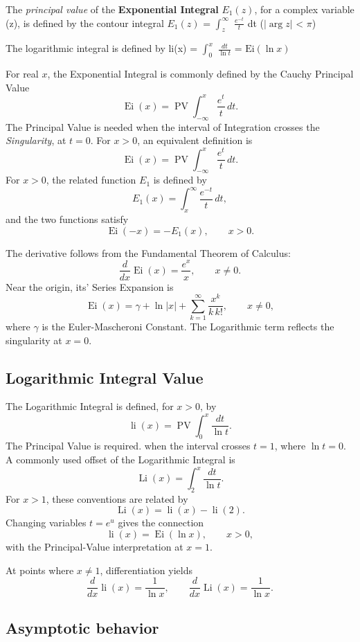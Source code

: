 \documentclass[a4paper, 10pt, onepage]{elegantbook}
\begin{document}
{The \emph{principal value} of the \textbf{Exponential Integral} $E_1(z)$, for a complex variable (z), is defined by the 
contour integral  $E_1(z)$ = $\int_{z}^{\infty}$ $\frac{e^{-t}}{t}$ dt \quad ($\vert \arg z \vert$ < $\pi$)  

The logarithmic integral is defined by $\text{li}$(x) = $\int_{0}^{x}$ $\frac{dt}{\ln t}$ = $\text{Ei}(\ln x)$  

For real \(x\), the Exponential Integral is commonly defined by the Cauchy Principal Value
\[
\operatorname{Ei}(x)
=\operatorname{PV}\int_{-\infty}^{x}\frac{e^t}{t}\,dt.
\]
The Principal Value is needed when the interval of Integration crosses the \emph{Singularity}, at \(t=0\). For \(x>0\), 
an equivalent definition is
\[
\operatorname{Ei}(x)
=\operatorname{PV}\int_{-\infty}^{x}\frac{e^t}{t}\,dt.
\]
For \(x>0\), the related function \(E_1\) is defined by
\[
E_1(x)=\int_x^\infty \frac{e^{-t}}{t}\,dt,
\]
and the two functions satisfy
\[
\operatorname{Ei}(-x)=-E_1(x),\qquad x>0.
\]

The derivative follows from the Fundamental Theorem of Calculus:
\[
\frac{d}{dx}\operatorname{Ei}(x)=\frac{e^x}{x},
\qquad x\ne 0.
\]
Near the origin, its' Series Expansion is
\[
\operatorname{Ei}(x)
=\gamma+\ln|x|
+\sum_{k=1}^{\infty}\frac{x^k}{k\,k!},
\qquad x\ne 0,
\]
where \(\gamma\) is the Euler-Mascheroni Constant. The Logarithmic term reflects the singularity at \(x=0\).

\subsection{Logarithmic Integral Value}

The Logarithmic Integral is defined, for \(x>0\), by
\[
\operatorname{li}(x)
=\operatorname{PV}\int_0^x \frac{dt}{\ln t}.
\]
The Principal Value is required. when the interval crosses \(t=1\),
where \(\ln t=0\). A commonly used offset of the Logarithmic Integral is
\[
\operatorname{Li}(x)
=\int_2^x \frac{dt}{\ln t}.
\]
For \(x>1\), these conventions are related by
\[
\operatorname{Li}(x)=\operatorname{li}(x)-\operatorname{li}(2).
\]
Changing variables \(t=e^u\) gives the connection
\[
\operatorname{li}(x)=\operatorname{Ei}(\ln x),
\qquad x>0,
\]
with the Principal-Value interpretation at \(x=1\).

At points where \(x\ne 1\), differentiation yields
\[
\frac{d}{dx}\operatorname{li}(x)=\frac{1}{\ln x},
\qquad
\frac{d}{dx}\operatorname{Li}(x)=\frac{1}{\ln x}.
\]

\subsection{Asymptotic behavior}

}
\end{document}
